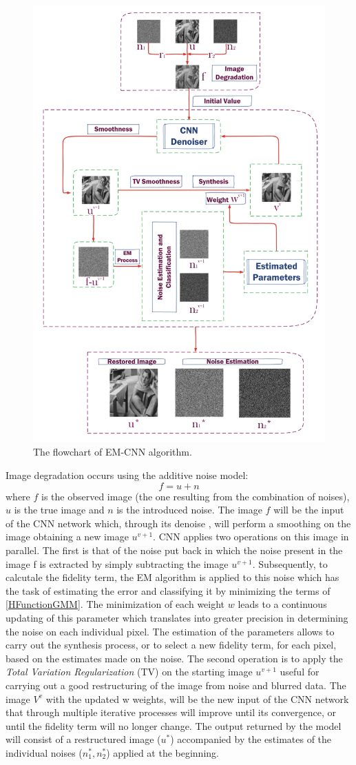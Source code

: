 \begin{figure}[h!]
    \centering
    \includegraphics[width = 0.7 \linewidth]{images/paper7/flowchart.png}
    \centering
    \caption{The flowchart of EM-CNN algorithm.}
    \label{fig:EM-CNN}
\end{figure}
Image degradation occurs using the additive noise model: 
$$ f = u + n $$
where $f$ is the observed image (the one resulting from the combination of 
noises), $u$ is the true image and $n$ is the introduced noise. The image $f$ will 
be the input of the CNN network which, through its denoise \cite{0884882819}, will perform 
a smoothing on the image obtaining a new image $u^{v+1}$. CNN applies two 
operations on this image in parallel. The first is that of the noise put back 
in which the noise present in the image f is extracted by simply subtracting 
the image $u^{v+1}$. Subsequently, to calcutale the fidelity term, the EM algorithm 
\cite{0884882814} is applied to this noise which has the task of estimating the error 
and classifying it by minimizing the terms of \ref{HFunctionGMM}. The minimization of each 
weight $w$ leads to a continuous updating of this parameter which translates 
into greater precision in determining the noise on each individual pixel. The 
estimation of the parameters allows to carry out the synthesis process, or to 
select a new fidelity term, for each pixel, based on the estimates made on the 
noise. The second operation is to apply the \emph{Total Variation Regularization} 
(TV) \cite{0884882802} on the starting image $u^{v+1}$ useful for carrying out a good 
restructuring of the image from noise and blurred data. The image $V^v$ with the 
updated w weights, will be the new input of the CNN network that through 
multiple iterative processes will improve until its convergence, or until the 
fidelity term will no longer change. The output returned by the model will 
consist of a restructured image ($u^*$) accompanied by the estimates of the 
individual noises ($n_1^ *, n_2^*$) applied at the beginning.
